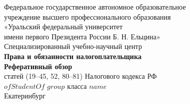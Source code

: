\documentclass{report}
\begin{document}
\begin{titlepage}
    \center
    \Large

    Федеральное государственное автономное образовательное\\
    учреждение высшего профессионального образования\\
    «Уральский федеральный университет\\
    имени первого Президента России Б. Н. Ельцина»\\
    Специализированный учебно-научный центр\\

    \vfill
    \textbf{Права и обязанности налогоплательщика}\\
    \textbf{Реферативный обзор}\\
    статей (19--45, 52, 80--81) Налогового кодекса РФ\\
    $ofStudentOf$ $group$ класса $name$\\

    \vfill
    {Екатеринбург}\\
    {\the\year}\\
\end{titlepage}
\end{document}
